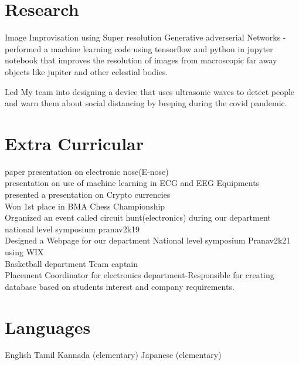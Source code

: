 \documentclass[]{deedy-resume-openfont}
\begin{document}
\begin{minipage}[t]{0.66\textwidth}
\section{Research}
Image Improvisation using Super resolution Generative adverserial Networks -performed a machine learning code using tensorflow and python in  jupyter notebook that improves the resolution of images from macroscopic far away objects like jupiter and other celestial bodies. 
\sectionsep

Led My team into designing a device that uses ultrasonic waves to detect people and warn them about social distancing by beeping during the covid pandemic. 
\sectionsep


\section{Extra Curricular} 

\textbullet{}paper presentation on electronic nose(E-nose)\\
\textbullet{}presentation on use of machine learning in ECG and EEG Equipments\\
\textbullet{}presented a presentation on Crypto currencies \\
\textbullet{}Won 1st place in BMA Chess Championship\\
\textbullet{}Organized an event called circuit hunt(electronics) during our department national level symposium pranav2k19\\
\textbullet{}Designed a Webpage for our department National level symposium Pranav2k21 using WIX\\
\textbullet{}Basketball department Team captain  \\
\textbullet{}Placement Coordinator for electronics department-Responsible for creating database based on students interest and company requirements.

\sectionsep


\section{Languages} 
\textbullet English \textbullet Tamil \textbullet Kannada (elementary) \textbullet Japanese (elementary)
\sectionsep

\end{minipage} 
\end{document}
